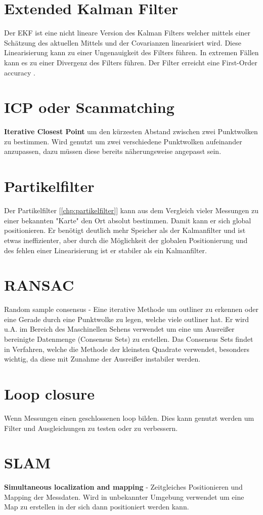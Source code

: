 \section{Extended Kalman Filter}
\label{chp:stoffübersicht:sec:ExtendedKalmanFilter}
Der EKF ist eine nicht lineare Version des Kalman Filters welcher mittels einer Schätzung des 
aktuellen Mittels und der Covarianzen linearisiert wird. Diese Linearisierung kann zu einer Ungenauigkeit des Filters führen. In extremen Fällen kann es zu einer Divergenz des Filters führen. Der Filter erreicht eine First-Order accuracy \cite{order-accuracy}.

\section{ICP oder Scanmatching}
\label{chp:stoffübersicht:sec:ICPoderScanmatching}
\textbf{Iterative Closest Point} um den kürzesten Abstand zwischen zwei Punktwolken zu bestimmen. Wird genutzt um zwei verschiedene Punktwolken aufeinander anzupassen, dazu müssen diese bereits näherungsweise angepasst sein.

\section{Partikelfilter}
\label{chp:stoffübersicht:sec:Partikelfilter}
Der Partikelfilter [\ref{chp:partikelfilter}] kann aus dem Vergleich vieler Messungen zu einer bekannten "Karte" den Ort absolut bestimmen. Damit kann er sich global positionieren. Er benötigt deutlich mehr Speicher als der Kalmanfilter und ist etwas ineffizienter, aber durch die Möglichkeit der globalen Positionierung und des fehlen einer Linearisierung ist er stabiler als ein Kalmanfilter.

\section{RANSAC}
\label{chp:stoffübersicht:sec:RANSAC}
Random sample consensus - Eine iterative Methode um outliner zu erkennen oder eine Gerade durch eine Punktwolke zu legen, welche viele outliner hat. Er wird u.A. im Bereich des Maschinellen Sehens verwendet um eine um Ausreißer bereinigte Datenmenge (Consensus Sets) zu erstellen. Das Consensus Sets findet in Verfahren, welche die Methode der kleinsten Quadrate verwendet, besonders wichtig, da diese mit Zunahme der Ausreißer instabiler werden.

\section{Loop closure}
\label{chp:stoffübersicht:sec:LoopClosure}
Wenn Messungen einen geschlossenen loop bilden. Dies kann genutzt werden um Filter und Ausgleichungen zu testen oder zu verbessern.

\section{SLAM}
\label{chp:stoffübersicht:sec:SLAM}
\textbf{Simultaneous localization and mapping} - Zeitgleiches Positionieren und Mapping der Messdaten. Wird in unbekannter Umgebung verwendet um eine Map zu erstellen in der sich dann positioniert werden kann.

